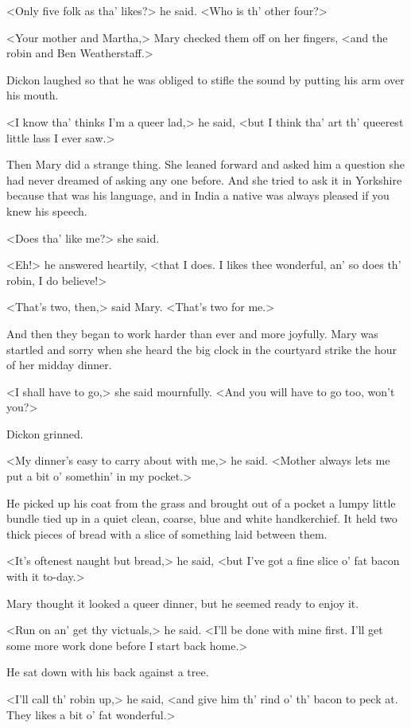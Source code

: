 <Only five folk as tha' likes?> he said. <Who is th' other four?>

<Your mother and Martha,> Mary checked them off on her fingers, <and the robin and Ben Weatherstaff.>

Dickon laughed so that he was obliged to stifle the sound by putting his arm over his mouth.

<I know tha' thinks I'm a queer lad,> he said, <but I think tha' art th' queerest little lass I ever saw.>

Then Mary did a strange thing. She leaned forward and asked him a question she had never dreamed of asking any one before. And she tried to ask it in Yorkshire because that was his language, and in India a native was always pleased if you knew his speech.

<Does tha' like me?> she said.

<Eh!> he answered heartily, <that I does. I likes thee wonderful, an' so does th' robin, I do believe!>

<That's two, then,> said Mary. <That's two for me.>

And then they began to work harder than ever and more joyfully. Mary was startled and sorry when she heard the big clock in the courtyard strike the hour of her midday dinner.

<I shall have to go,> she said mournfully. <And you will have to go too, won't you?>

Dickon grinned.

<My dinner's easy to carry about with me,> he said. <Mother always lets me put a bit o' somethin' in my pocket.>

He picked up his coat from the grass and brought out of a pocket a lumpy little bundle tied up in a quiet clean, coarse, blue and white handkerchief. It held two thick pieces of bread with a slice of something laid between them.

<It's oftenest naught but bread,> he said, <but I've got a fine slice o' fat bacon with it to-day.>

Mary thought it looked a queer dinner, but he seemed ready to enjoy it.

<Run on an' get thy victuals,> he said. <I'll be done with mine first. I'll get some more work done before I start back home.>

He sat down with his back against a tree.

<I'll call th' robin up,> he said, <and give him th' rind o' th' bacon to peck at. They likes a bit o' fat wonderful.>

